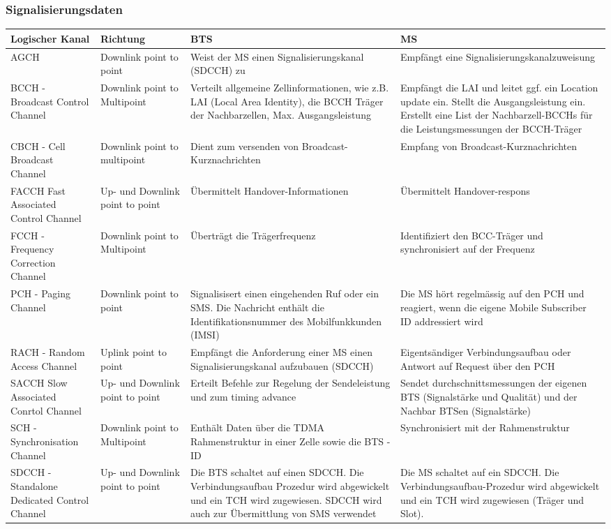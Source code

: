 \subsubsection{Signalisierungsdaten}
\begin{tabular}{p{0.15 \linewidth} p{0.15 \linewidth} p{0.35 \linewidth} p{0.35 \linewidth}}
\toprule
Logischer Kanal & Richtung & BTS & MS \\
\midrule
AGCH & Downlink point to point & Weist der MS einen Signalisierungskanal (SDCCH) zu & Empfängt eine Signalisierungskanalzuweisung \\
\midrule
BCCH - Broadcast Control Channel & Downlink point to Multipoint & Verteilt allgemeine Zellinformationen, wie z.B. LAI (Local Area Identity), die BCCH Träger der Nachbarzellen, Max. Ausgangsleistung & Empfängt die LAI und leitet  ggf. ein Location update ein. 
Stellt die Ausgangsleistung ein.
 Erstellt eine List der Nachbarzell-BCCHs für die Leistungsmessungen der BCCH-Träger \\
\midrule
CBCH - Cell Broadcast Channel & Downlink point to multipoint & Dient zum versenden von Broadcast-Kurznachrichten & Empfang von Broadcast-Kurznachrichten\\
\midrule
FACCH Fast Associated Control Channel & Up- und Downlink point to point & Übermittelt Handover-Informationen & Übermittelt Handover-respons\\
\midrule
FCCH - Frequency Correction Channel & Downlink point to Multipoint & Überträgt die Trägerfrequenz & Identifiziert den BCC-Träger und synchronisiert auf der Frequenz \\
\midrule
PCH - Paging Channel & Downlink point to point & Signalisisert einen eingehenden Ruf oder ein SMS. Die Nachricht enthält die Identifikationsnummer des Mobilfunkkunden (IMSI) & Die MS hört regelmässig auf den PCH und reagiert, wenn die eigene Mobile Subscriber ID addressiert wird \\
\midrule
RACH - Random Access Channel & Uplink point to point & Empfängt die Anforderung einer MS einen Signalisierungskanal aufzubauen (SDCCH) & Eigentsändiger Verbindungsaufbau oder Antwort auf Request über den PCH \\
\midrule
SACCH Slow Associated Conrtol Channel & Up- und Downlink point to point & Erteilt Befehle zur Regelung der Sendeleistung und zum timing advance & Sendet durchschnittsmessungen der eigenen BTS (Signalstärke und Qualität) und der Nachbar BTSen (Signalstärke) \\
\midrule
SCH - Synchronisation Channel & Downlink point to Multipoint & Enthält Daten über die TDMA Rahmenstruktur in einer Zelle sowie die BTS - ID & Synchronisiert mit der Rahmenstruktur \\
\midrule
SDCCH - Standalone Dedicated Control Channel & Up- und Downlink point to point & Die BTS schaltet auf einen SDCCH.
Die Verbindungsaufbau Prozedur wird abgewickelt und ein TCH wird zugewiesen.
SDCCH wird auch zur Übermittlung von SMS verwendet & Die MS schaltet auf ein SDCCH.
Die Verbindungsaufbau-Prozedur wird abgewickelt und ein TCH wird zugewiesen (Träger und Slot).\\
\bottomrule

\end{tabular}

